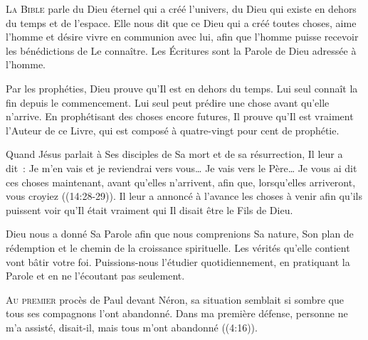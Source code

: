 \lettrine{L}{a Bible} parle du Dieu éternel qui a créé l'univers,
 du Dieu qui existe en dehors du temps et de l'espace.
 Elle nous dit que ce Dieu qui a créé toutes choses,
 aime l'homme et désire vivre en communion avec lui,
 afin que l'homme puisse recevoir les bénédictions de Le connaître.
 Les Écritures sont la Parole de Dieu adressée à l'homme.


Par les prophéties, Dieu prouve qu'Il est en dehors du temps.
 Lui seul connaît la fin depuis le commencement.
 Lui seul peut prédire une chose avant qu'elle n'arrive.
 En prophétisant des choses encore futures, Il prouve qu'Il est vraiment
 l'Auteur de ce Livre, qui est composé à quatre-vingt pour cent de prophétie. 

Quand Jésus parlait à Ses disciples de Sa mort et de sa résurrection,
 Il leur a dit~: 
 \og Je m'en vais et je reviendrai vers vous\dots{}
 Je vais vers le Père\dots{} Je vous ai dit ces choses maintenant,
 avant qu'elles n'arrivent, afin que, lorsqu'elles arriveront,
 vous croyiez \fg{} ((14:28-29)).
 Il leur a annoncé à l'avance les choses à venir afin qu'ils puissent
 voir qu'Il était vraiment qui Il disait être \ocadr le Fils de Dieu. 

Dieu nous a donné Sa Parole afin que nous comprenions Sa nature,
 Son plan de rédemption et le chemin de la croissance spirituelle.
 Les vérités qu'elle contient vont bâtir votre foi.
 Puissions-nous l'étudier quotidiennement, en pratiquant la Parole
 et en ne l'écoutant pas seulement.

\dvrule






\lettrine{A}{u premier} procès de Paul devant Néron,
 sa situation semblait si sombre que tous ses compagnons l'ont abandonné.
 \og Dans ma première défense, personne ne m'a assisté,
 disait-il, mais tous m'ont abandonné \fg{}
 ((4:16)).

